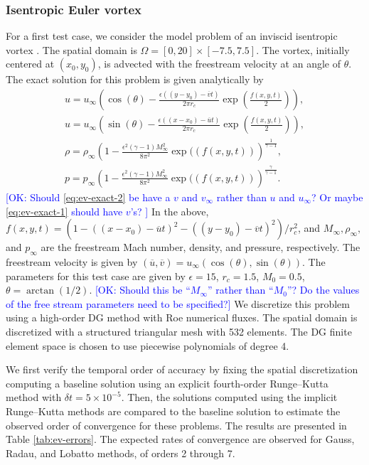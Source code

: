 \documentclass[review]{siamart}
\newcommand{\OK}[1]{\textcolor{blue}{[OK: #1]}}
\begin{document}
\subsubsection{Isentropic Euler vortex}
For a first test case, we consider the model problem of an inviscid isentropic vortex \cite{Shu1998,Wang2013}.
The spatial domain is $\Omega = [0,20] \times [-7.5,7.5]$.
The vortex, initially centered at $(x_0, y_0)$, is advected with the freestream velocity at an angle of $\theta$.
The exact solution for this problem is given analytically by
\begin{gather}
\label{eq:ev-exact-1}
   u = u_\infty \left( \cos(\theta) - \frac{\epsilon ((y-y_0)
       - \overline{v} t)}{2\pi r_c}
       \exp\left( \frac{f(x,y,t)}{2} \right) \right),\\
\label{eq:ev-exact-2}
   u = u_\infty \left( \sin(\theta) - \frac{\epsilon ((x-x_0)
       - \overline{u} t)}{2\pi r_c}
       \exp\left( \frac{f(x,y,t)}{2} \right) \right),\\
\label{eq:ev-exact-3}
   \rho = \rho_\infty \left( 1 -
       \frac{\epsilon^2 (\gamma - 1)M^2_\infty}{8\pi^2} \exp((f(x,y,t))
       \right)^{\frac{1}{\gamma-1}}, \\
\label{eq:ev-exact-4}
   p = p_\infty \left( 1 -
       \frac{\epsilon^2 (\gamma - 1)M^2_\infty}{8\pi^2} \exp((f(x,y,t))
       \right)^{\frac{\gamma}{\gamma-1}}.
\end{gather}
%
\OK{
Should \eqref{eq:ev-exact-2} be have a $v$ and $v_{\infty}$ rather than $u$ and $u_{\infty}$? Or maybe \eqref{eq:ev-exact-1} should have $v$'s?
}
%
In the above, $f(x,y,t) = (1 - ((x-x_0) - \overline{u}t)^2 - ((y-y_0) - \overline{v}t)^2)/r_c^2$, and $M_\infty, \rho_\infty,$ and $p_\infty$ are the freestream Mach number, density, and pressure, respectively.
The freestream velocity is given by $(\overline{u},\overline{v}) = u_\infty (\cos(\theta), \sin(\theta))$.
The parameters for this test case are given by $\epsilon = 15$, $r_c = 1.5$, $M_0 = 0.5$, $\theta = \arctan(1/2)$. 
%
\OK{Should this be ``$M_{\infty}$'' rather than ``$M_0$''? Do the values of the free stream parameters need to be specified?}
%
We discretize this problem using a high-order DG method with Roe numerical fluxes.
The spatial domain is discretized with a structured triangular mesh with 532 elements.
The DG finite element space is chosen to use piecewise polynomials of degree 4.

We first verify the temporal order of accuracy by fixing the spatial discretization  computing a baseline solution using an explicit fourth-order Runge--Kutta method with $\delta t = 5\times 10^{-5}$.
Then, the solutions computed using the implicit Runge--Kutta methods are compared to the baseline solution to estimate the observed order of convergence for these problems.
The results are presented in Table \ref{tab:ev-errors}.
The expected rates of convergence are observed for Gauss, Radau, and Lobatto methods, of orders 2 through 7.
\end{document}
